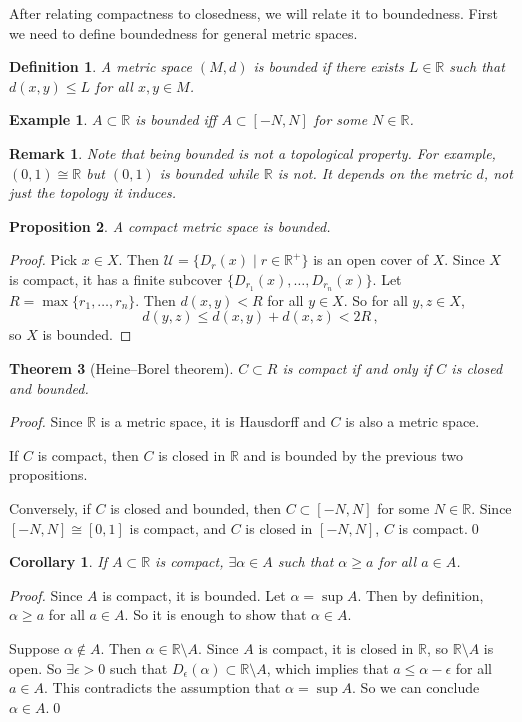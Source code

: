 \documentclass{article}
\theoremstyle{plain}\theoremheaderfont{\normalfont\itshape}\theorembodyfont{\rmfamily}\theoremseparator{.}\newtheorem*{rem}{Remark}\newtheorem*{ex}{Example}\newtheorem*{proof}{Proof}\newtheorem*{altp}{Alternative proof}
\theoremstyle{plain}\theoremheaderfont{\normalfont\bfseries}\theorembodyfont{\rmfamily}\theoremseparator{.}\newtheorem{thm}{Theorem}[section]\newtheorem{lem}[thm]{Lemma}\newtheorem{prop}[thm]{Proposition}\newtheorem*{cor}{Corollary}\newtheorem{defn}[thm]{Definition}\newtheorem{clm}[thm]{Claim}\newtheorem{clminproof}{Claim}
\theoremstyle{break}\theoremheaderfont{\normalfont\itshape}\theorembodyfont{\rmfamily}\theoremseparator{.\medskip}\newtheorem*{proofskip}{Proof}\newtheorem*{exs}{Examples}\newtheorem*{rems}{Remarks}
\theoremstyle{break}\theoremheaderfont{\normalfont\bfseries}\theorembodyfont{\rmfamily}\theoremseparator{.\medskip}\newtheorem{lemskip}[thm]{Lemma}\newtheorem{defnskip}[thm]{Definition}\newtheorem{propskip}[thm]{Proposition}\newtheorem{thmskip}[thm]{Theorem}
\newcommand{\qed}{\hfill\ensuremath{\Box}}
\begin{document}
    After relating compactness to closedness, we will relate it to boundedness. First we need to define boundedness for general metric spaces.
    \begin{defn}
        A metric space \((M,d)\) is \textit{bounded} if there exists \(L\in\mathbb{R}\) such that \(d(x,y)\le L\) for all \(x,y\in M\).
    \end{defn}
    \begin{ex}
        \(A\subset\mathbb{R}\) is bounded iff \(A\subset[-N,N]\) for some \(N\in\mathbb{R}\).
    \end{ex}
    \begin{rem}
        Note that being bounded is not a topological property. For example, \((0, 1)\cong\mathbb{R}\) but \((0,1)\) is bounded while \(\mathbb{R}\) is not. It depends on the metric \(d\), not just the topology it induces.
    \end{rem}
    \begin{prop}
        A compact metric space is bounded.
    \end{prop}
    \begin{proof}
        Pick \(x\in X\). Then \(\mathscr{U}=\{D_r(x)\mid r\in\mathbb{R}^+\}\) is an open cover of \(X\). Since \(X\) is compact, it has a finite subcover \(\{D_{r_1}(x),\dots,D_{r_n}(x)\}\). Let \(R=\max\{r_1,\dots,r_n\}\). Then \(d(x,y)<R\) for all \(y\in X\). So for all \(y,z\in X\),
        \[d(y,z)\le d(x,y)+d(x,z)<2R\,,\]
        so \(X\) is bounded.
    \end{proof}
    \begin{thm}[Heine--Borel theorem]
        \(C\subset R\) is compact if and only if \(C\) is closed and bounded.
    \end{thm}
    \begin{proof}
        Since \(\mathbb{R}\) is a metric space, it is Hausdorff and \(C\) is also a metric space.

        If \(C\) is compact, then \(C\) is closed in \(\mathbb{R}\) and is bounded by the previous two propositions.

        Conversely, if \(C\) is closed and bounded, then \(C\subset[-N,N]\) for some \(N\in\mathbb{R}\). Since \([-N,N]\cong[0,1]\) is compact, and \(C\) is closed in \([-N,N]\), \(C\) is compact.\qed
    \end{proof}
    \begin{cor}
        If \(A\subset\mathbb{R}\) is compact, \(\exists\alpha\in A\) such that \(\alpha\ge a\) for all \(a\in A\).
    \end{cor}
    \begin{proof}
        Since \(A\) is compact, it is bounded. Let \(\alpha=\sup A\). Then by definition, \(\alpha\ge a\) for all \(a\in A\). So it is enough to show that \(\alpha\in A\).

        Suppose \(\alpha\not\in A\). Then \(\alpha\in\mathbb{R}\setminus A\). Since \(A\) is compact, it is closed in \(\mathbb{R}\), so \(\mathbb{R}\setminus A\) is open. So \(\exists\epsilon>0\) such that \(D_\epsilon(\alpha)\subset\mathbb{R}\setminus A\), which implies that \(a\le\alpha-\epsilon\) for all \(a\in A\). This contradicts the assumption that \(\alpha=\sup A\). So we can conclude \(\alpha\in A\).\qed
    \end{proof}
\end{document}

